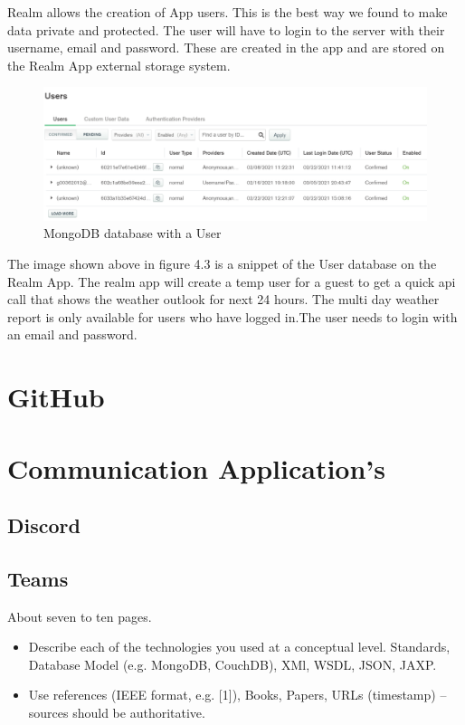 Realm allows the creation of App users. This is the best way we found to make data private and protected. The user will have to login to the server with their username, email and password. These are created in the app and are stored on the Realm App external storage system.
\begin{figure}[H]
    \centering
    \includegraphics[width=13cm]{img/Users.PNG}
    \caption{MongoDB database with a User}
    \label{fig:altas config}
\end{figure}
The image shown above in figure 4.3 is a snippet of the User database on the Realm App. The realm app will create a temp user for a guest to get a quick api call that shows the weather outlook for next 24 hours. The multi day weather report is only available for users who have logged in.The user needs to login with an email and password.

\section{GitHub}
\section{Communication Application's}
\subsection{Discord}
\subsection{Teams}

About seven to ten pages.
\begin{itemize}
\item Describe each of the technologies you used at a conceptual level. Standards, Database Model (e.g. MongoDB, CouchDB), XMl, WSDL, JSON, JAXP.
\item Use references (IEEE format, e.g. [1]), Books, Papers, URLs (timestamp) – sources should be authoritative. 
\end{itemize}

